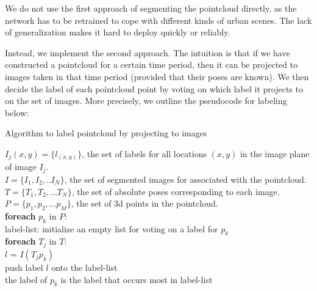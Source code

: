 We do not use the first approach of segmenting the pointcloud directly, as the network has to be retrained to cope with different kinds of urban scenes. The lack of generalization makes it hard to deploy quickly or reliably. 

Instead, we implement the second approach. The intuition is that if we have constructed a pointcloud for a certain time period, then it can be projected to images taken in that time period (provided that their poses are known). We then decide the label of each pointcloud point by voting on which label it projects to on the set of images. More precisely, we outline the pseudocode for labeling below:

\begin{algorithm}
\caption{Algorithm to label pointcloud by projecting to images}
\begin{algorithmic}
\REQUIRE $I_j(x,y) = \{l_{(x,y)}\}$, the set of labels for all locations $(x,y)$ in the image plane of image $I_j$.\\
$I = \{I_1, I_2,..I_N\}$, the set of segmented images for associated with the pointcloud.\\
$T = \{T_1, T_2,...T_N\}$, the set of absolute poses corresponding to each image.\\
$P = \{p_1, p_2, ...p_M\}$, the set of 3d points in the pointcloud. \\
\vspace{5 mm}
\textbf{foreach} $p_k$ in $P$:\\
   
   \hspace{5 mm} label-list: initialize an empty list for voting on a label for $p_k$\\
    \hspace{5 mm}\textbf{foreach} $T_j$ in $T$:\\
      \hspace{5 mm}\hspace{5 mm}$l$ = $I(T_j p_k)$\\
      \hspace{5 mm}\hspace{5 mm}push label $l$ onto the label-list\\
the label of $p_k$ is the label that occurs most in label-list\\
\end{algorithmic}
\end{algorithm}






